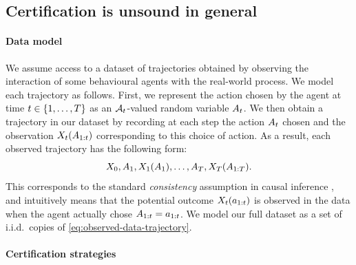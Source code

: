 %

%


\subsection{Certification is unsound in general}

\paragraph{Data model}

We assume access to a dataset of trajectories obtained by observing the interaction of some behavioural agents with the real-world process.
We model each trajectory as follows.
First, we represent the action chosen by the agent at time $t \in \{1, \ldots, T\}$ as an $\mathcal{A}_t$-valued random variable $A_t$.
We then obtain a trajectory in our dataset by recording at each step the action $A_t$ chosen and the observation $X_t(A_{1:t})$ corresponding to this choice of action.
%
As a result, each observed trajectory has the following form:
\begin{equation} \label{eq:observed-data-trajectory}
    X_0, A_1, X_1(A_1), \ldots, A_T, X_T(A_{1:T}).
\end{equation}
This corresponds to the standard \emph{consistency} assumption in causal inference \cite{hernan2020causal}, and intuitively means that the potential outcome $X_t(a_{1:t})$ is observed in the data when the agent actually chose $A_{1:t} = a_{1:t}$.
%
%
We model our full dataset as a set of i.i.d.\ copies of \eqref{eq:observed-data-trajectory}. %

%
%
%

%
\paragraph{Certification strategies}
%

